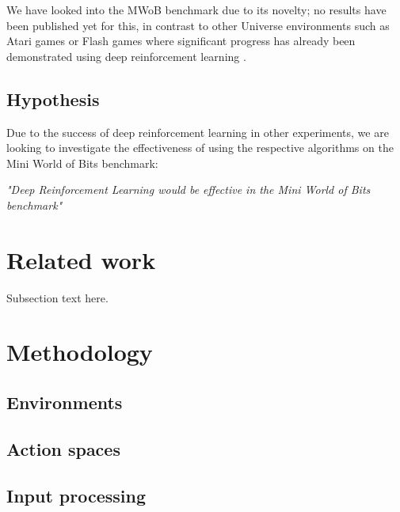\documentclass[conference]{IEEEtran}
\begin{document}
We have looked into the MWoB benchmark due to its novelty; no results have been published yet for this, in contrast to other Universe environments such as Atari games or Flash games where significant progress has already been demonstrated using deep reinforcement learning \cite{mnih2013playing}.

\subsection{Hypothesis}
Due to the success of deep reinforcement learning in other experiments, we are looking to investigate the effectiveness of using the respective algorithms on the Mini World of Bits benchmark:
\begin{center}
\textit{"Deep Reinforcement Learning would be effective in the Mini World of Bits benchmark"}
\end{center}

\section{Related work}
Subsection text here.

\section{Methodology}

\subsection{Environments}

\subsection{Action spaces}

\subsection{Input processing}
\end{document}
